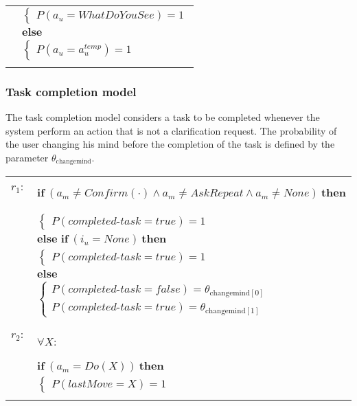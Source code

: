 \begin{footnotesize}
\begin{longtable}{p{1cm}l}
& \;\;\;\;\; $ \begin{cases}P(\mathit{a_u}\!=\!\mathit{WhatDoYouSee})\!=\!1 \end{cases}$\\[3mm] & $ \textbf{else}$ \\
& \;\;\;\;\; $ \begin{cases}P(\mathit{a_u}\!=\!\mathit{{a_u^{temp}}})\!=\!1 \end{cases}$ \\ \\[-2mm]
\end{longtable}
\end{footnotesize}

\subsubsection*{Task completion model}

The task completion model considers a task to be completed whenever the system perform an action that is not a clarification request. The probability of the user changing his mind before the completion of the task is defined by the parameter $\theta_{\mathrm{changemind}}$. 

\begin{footnotesize}
\begin{longtable}{p{2cm}l}
$r_{1}$: \ \ & $ \textbf{if} \ (\mathit{a_m}\!\neq\!\mathit{Confirm(\cdot)} \land \mathit{a_m}\!\neq\!\mathit{AskRepeat} \land \mathit{a_m}\!\neq\!\mathit{None}) \ \textbf{then} $ \\
 & \;\;\;\;\; $ \begin{cases}P(\mathit{completed\mbox{-}task}\!=\!\mathit{true})\!=\!1 \end{cases}$\\[3mm] & $ \textbf{else if} \ (\mathit{i_u}\!=\!\mathit{None}) \ \textbf{then}$ \\
& \;\;\;\;\; $ \begin{cases}P(\mathit{completed\mbox{-}task}\!=\!\mathit{true})\!=\!1 \end{cases}$\\[3mm] & $ \textbf{else}$ \\
& \;\;\;\;\; $ \begin{cases}P(\mathit{completed\mbox{-}task}\!=\!\mathit{false})\!=\!\theta_{\mathrm{changemind[0]}} \\
P(\mathit{completed\mbox{-}task}\!=\!\mathit{true})\!=\!\theta_{\mathrm{changemind[1]}} \end{cases}$ \\ \\[-2mm]
$r_{2}$: \ \ & $ \forall X : $ \\ & $ \textbf{if} \ (\mathit{a_m}\!=\!\mathit{Do(X)}) \ \textbf{then} $ \\
 & \;\;\;\;\; $ \begin{cases}P(\mathit{lastMove}\!=\!\mathit{X})\!=\!1 \end{cases}$ \\ \\[-2mm]
\end{longtable}
\end{footnotesize}

